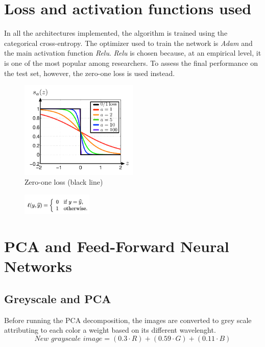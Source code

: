 \documentclass[10pt,english, openany]{book}
\begin{document}
\chapter{Loss and activation functions used}
In all the architectures implemented, the algorithm is trained using the categorical cross-entropy. The optimizer used to train the network is \textit{Adam} and the main activation function \textit{Relu}. \textit{Relu} is chosen because, at an empirical level, it is one of the most popular among researchers.
To assess the final performance on the test set, however, the zero-one loss is used instead.

\begin{figure}[h]
    \centering
    \includegraphics[width=0.5\textwidth]{Images/zero-one loss.png}
    \caption{\label{fig:3.1} Zero-one loss (black line)}
\end{figure}


\begin{figure}[h]
    \centering
    \includegraphics[width=0.3\textwidth]{Images/zero formula.png}
\end{figure}

\chapter{PCA and Feed-Forward Neural Networks}\label{chapt:doe}

\section{Greyscale and PCA}
Before running the PCA decomposition, the images are converted to grey scale attributing to each color a weight based on its different wavelenght.
$$
\textit{New grayscale image} = (0.3 \cdot R) + (0.59 \cdot G) + (0.11 \cdot B)
$$
\end{document}
